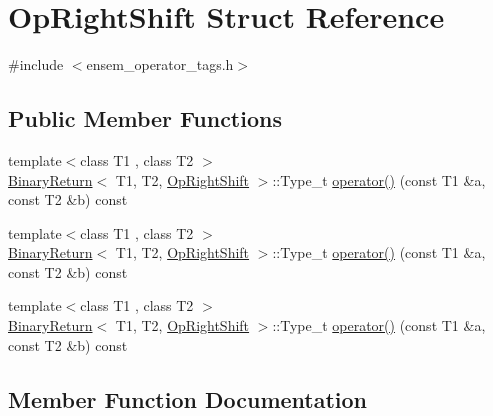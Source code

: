 \hypertarget{structOpRightShift}{}\section{Op\+Right\+Shift Struct Reference}
\label{structOpRightShift}


{\ttfamily \#include $<$ensem\+\_\+operator\+\_\+tags.\+h$>$}

\subsection*{Public Member Functions}
\begin{DoxyCompactItemize}
\item 
{\footnotesize template$<$class T1 , class T2 $>$ }\\\mbox{\hyperlink{structBinaryReturn}{Binary\+Return}}$<$ T1, T2, \mbox{\hyperlink{structOpRightShift}{Op\+Right\+Shift}} $>$\+::Type\+\_\+t \mbox{\hyperlink{structOpRightShift_a8b6b10211df9e2bcb0e8ce90458f12b8}{operator()}} (const T1 \&a, const T2 \&b) const
\item 
{\footnotesize template$<$class T1 , class T2 $>$ }\\\mbox{\hyperlink{structBinaryReturn}{Binary\+Return}}$<$ T1, T2, \mbox{\hyperlink{structOpRightShift}{Op\+Right\+Shift}} $>$\+::Type\+\_\+t \mbox{\hyperlink{structOpRightShift_a8b6b10211df9e2bcb0e8ce90458f12b8}{operator()}} (const T1 \&a, const T2 \&b) const
\item 
{\footnotesize template$<$class T1 , class T2 $>$ }\\\mbox{\hyperlink{structBinaryReturn}{Binary\+Return}}$<$ T1, T2, \mbox{\hyperlink{structOpRightShift}{Op\+Right\+Shift}} $>$\+::Type\+\_\+t \mbox{\hyperlink{structOpRightShift_a8b6b10211df9e2bcb0e8ce90458f12b8}{operator()}} (const T1 \&a, const T2 \&b) const
\end{DoxyCompactItemize}


\subsection{Member Function Documentation}
\mbox{\label{structOpRightShift_a8b6b10211df9e2bcb0e8ce90458f12b8}} 
